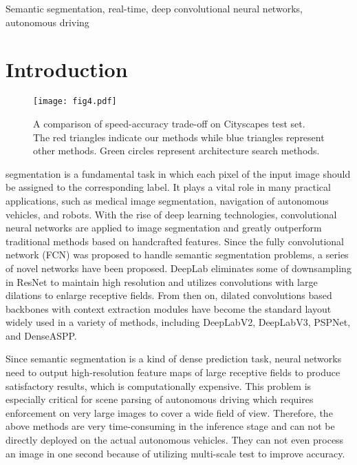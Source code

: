 \documentclass[journal]{IEEEtran}
\begin{document}
\begin{IEEEkeywords}
Semantic segmentation, real-time, deep convolutional neural networks, autonomous driving
\end{IEEEkeywords}






\IEEEpeerreviewmaketitle



\section{Introduction}
\begin{figure}[!t]
\centerline{\texttt{[image: fig4.pdf]}}
\caption{A comparison of speed-accuracy trade-off on Cityscapes test set. The red triangles indicate our methods while blue triangles represent other methods. Green circles represent architecture search methods.}
\label{fig4}
\end{figure}

 segmentation is a fundamental task in which each pixel of the input image should be assigned to the corresponding label\cite{8006236,8760555,9126262}. It plays a vital role in many practical applications, such as medical image segmentation, navigation of autonomous vehicles, and robots\cite{8264783,romera2017erfnet}. With the rise of deep learning technologies, convolutional neural networks are applied to image segmentation and greatly outperform traditional methods based on handcrafted features. Since the fully convolutional network (FCN)\cite{long2015fully} was proposed to handle semantic segmentation problems, a series of novel networks have been proposed. DeepLab\cite{chen2014semantic} eliminates some of downsampling in ResNet to maintain high resolution and utilizes convolutions with large dilations\cite{mallat1999wavelet} to enlarge receptive fields. From then on, dilated convolutions based backbones with context extraction modules have become the standard layout widely used in a variety of methods, including DeepLabV2\cite{chen2017deeplab}, DeepLabV3\cite{chen2017rethinking}, PSPNet\cite{zhao2017pyramid}, and DenseASPP\cite{yang2018denseaspp}.

Since semantic segmentation is a kind of dense prediction task, neural networks need to output high-resolution feature maps of large receptive fields to produce satisfactory results, which is computationally expensive. This problem is especially critical for scene parsing of autonomous driving which requires enforcement on very large images to cover a wide field of view. Therefore, the above methods are very time-consuming in the inference stage and can not be directly deployed on the actual autonomous vehicles. They can not even process an image in one second because of utilizing multi-scale test to improve accuracy.
\end{document}
